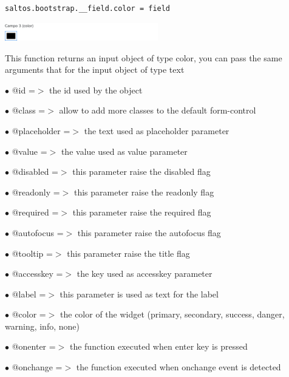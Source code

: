 \documentclass[a4paper]{article}
\begin{document}
\begin{lstlisting}
saltos.bootstrap.__field.color = field
\end{lstlisting}

\begin{center}\includegraphics[width=0.5\textwidth]{../ujest/snaps/test-bootstrap-js-bootstrap-campo-3-color-1-snap.png}\end{center}

This function returns an input object of type color, you can pass the same
arguments that for the input object of type text

\begin{compactitem}
\item[\color{myblue}$\bullet$] @id          =$>$ the id used by the object
\item[\color{myblue}$\bullet$] @class       =$>$ allow to add more classes to the default form-control
\item[\color{myblue}$\bullet$] @placeholder =$>$ the text used as placeholder parameter
\item[\color{myblue}$\bullet$] @value       =$>$ the value used as value parameter
\item[\color{myblue}$\bullet$] @disabled    =$>$ this parameter raise the disabled flag
\item[\color{myblue}$\bullet$] @readonly    =$>$ this parameter raise the readonly flag
\item[\color{myblue}$\bullet$] @required    =$>$ this parameter raise the required flag
\item[\color{myblue}$\bullet$] @autofocus   =$>$ this parameter raise the autofocus flag
\item[\color{myblue}$\bullet$] @tooltip     =$>$ this parameter raise the title flag
\item[\color{myblue}$\bullet$] @accesskey   =$>$ the key used as accesskey parameter
\item[\color{myblue}$\bullet$] @label       =$>$ this parameter is used as text for the label
\item[\color{myblue}$\bullet$] @color       =$>$ the color of the widget (primary, secondary, success, danger, warning, info, none)
\item[\color{myblue}$\bullet$] @onenter     =$>$ the function executed when enter key is pressed
\item[\color{myblue}$\bullet$] @onchange    =$>$ the function executed when onchange event is detected
\end{compactitem}
\end{document}

